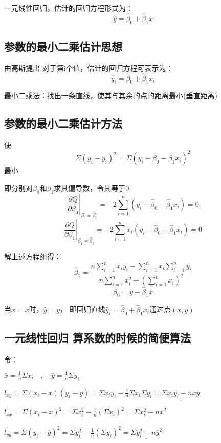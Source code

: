 \documentclass[UTF8,10pt]{book}
\begin{document}
一元线性回归，估计的回归方程形式为： 
$$ \hat{y} = \hat{\beta}_0 + \hat{\beta}_1 x $$

\subsection{参数的最小二乘估计思想}	

由高斯提出 对于第i个值，估计的回归方程可表示为： 
$$ \hat{y_i} = \hat{\beta}_0 + \hat{\beta}_1 x_i $$ 

最小二乘法：找出一条直线，使其与其余的点的距离最小(垂直距离)

\subsection{参数的最小二乘估计方法}	

使 
$$\Sigma(y_i - \hat{y}_i)^2 = \Sigma(y_i - \hat{\beta}_0 - \hat{\beta}_1 x_i)^2$$ 
最小 

即分别对$\beta_0$和$\beta_1$求其偏导数，令其等于0 
$$ \left. \frac{\partial Q}{\partial \beta_0}\right|_{\beta_0 = \hat{\beta}_0} = -2 \sum_{i=1}^n (y_i - \hat{\beta}_0 - \hat{\beta}_1 x_i) = 0 $$ 
$$ \left. \frac{\partial Q}{\partial \beta_1}\right|_{\beta_1 = \hat{\beta}_1} = -2 \sum_{i=1}^n x_i(y_i - \hat{\beta}_0 - \hat{\beta}_1 x_i) = 0 $$ 

解上述方程组得： 
$$ \hat{\beta}_1 = \frac{n \sum_{i=1}^n x_i y_i - \sum_{i=1}^n x_i \sum_{i=1}^n y_i}{n \sum_{i=1}^n x_i^2 - \left(\sum_{i=1}^n x_i\right)^2} $$ 
$$\hat{\beta}_0 = \overline{y} - \hat{\beta}_1 \overline{x}$$ 

当$x=\overline{x}$时，$\hat{y}=\overline{y}$，
即回归直线$\hat{y}_i=\hat{\beta}_0+\hat{\beta}_1 x_i$通过点$(\overline{x},\overline{y})$


\subsection{一元线性回归 算系数的时候的简便算法}	
令： 

$ \overline{x}=\frac{1}{n}\Sigma x_i \quad , \quad \overline{y}=\frac{1}{n}\Sigma y_i $ 

$ l_{xy} = \Sigma(x_i-\overline{x})(y_i-\overline{y}) = \Sigma x_i y_i - \frac{1}{n}\Sigma x_i \Sigma y_i = \underline{\Sigma x_i y_i - n\overline{x}\overline{y}} $ 


$ l_{xx} = \Sigma (x_i - \overline{x})^2 = \Sigma x_i^2 - \frac{1}{n}(\Sigma x_i)^2 = \underline{\Sigma x_i^2 - n \overline{x}^2} $ 

$ l_{yy} = \Sigma (y_i - \overline{y})^2 = \Sigma y_i^2 - \frac{1}{n}(\Sigma y_i)^2 = \underline{\Sigma y_i^2 - n \overline{y}^2} $ 
\end{document}
